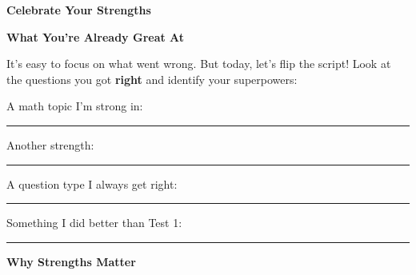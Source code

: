 \clearpage
\thispagestyle{empty}
{\sffamily

\begin{center}
{\fontsize{22}{26}\selectfont\bfseries\color{funGreen} \faAward\hspace{3mm}Celebrate Your Strengths\hspace{3mm}\faAward}

\vspace{2mm}
{\color{funGray}\hrulefill}
\end{center}

\vspace{3mm}

\begin{tcolorbox}[
    enhanced,
    colback=funGreenLight,
    colframe=funGreen!50,
    arc=10pt,
    boxrule=1.5pt,
    left=6mm, right=6mm, top=5mm, bottom=5mm,
]
{\large\bfseries\color{funGreenDark} \faThumbsUp\hspace{2mm}What You're Already Great At}

\vspace{2mm}

It's easy to focus on what went wrong. But today, let's flip the script! Look at the questions you got \textbf{right} and identify your superpowers:

\vspace{3mm}

\faStar\hspace{2mm}A math topic I'm strong in: \rule[-2pt]{5cm}{0.5pt}

\vspace{2mm}

\faStar\hspace{2mm}Another strength: \rule[-2pt]{6cm}{0.5pt}

\vspace{2mm}

\faStar\hspace{2mm}A question type I always get right: \rule[-2pt]{4cm}{0.5pt}

\vspace{2mm}

\faStar\hspace{2mm}Something I did better than Test 1: \rule[-2pt]{4.5cm}{0.5pt}
\end{tcolorbox}

\vspace{3mm}

\begin{tcolorbox}[
    enhanced,
    colback=funYellowLight,
    colframe=funYellow!60,
    arc=10pt,
    boxrule=1pt,
    left=6mm, right=6mm, top=4mm, bottom=4mm,
]
{\bfseries\color{funYellowDark} \faLightbulb\hspace{2mm}Why Strengths Matter}


\end{tcolorbox}}
